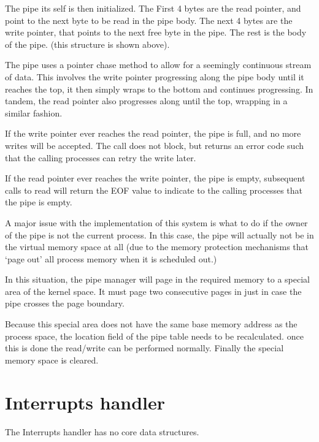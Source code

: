 \documentclass[a4paper]{report}
\begin{document}
The pipe its self is then initialized. The First 4 bytes are the read pointer, and point to the next byte to be read in the pipe body. The next 4 bytes are the write pointer, that points to the next free byte in the pipe. The rest is the body of the pipe. (this structure is shown above).

The pipe uses a pointer chase method to allow for a seemingly continuous stream of data. This involves the write pointer progressing along the pipe body until it reaches the top, it then simply wraps to the bottom and continues progressing. In tandem, the read pointer also progresses along until the top, wrapping in a similar fashion.

If the write pointer ever reaches the read pointer, the pipe is full, and no more writes will be accepted. The call does not block, but returns an error code such that the calling processes can retry the write later.

If the read pointer ever reaches the write pointer, the pipe is empty, subsequent calls to read will return the EOF value to indicate to the calling processes that the pipe is empty.

A major issue with the implementation of this system is what to do if the owner of the pipe is not the current process. In this case, the pipe will actually not be in the virtual memory space at all (due to the memory protection mechanisms that `page out' all process memory when it is scheduled out.)

In this situation, the pipe manager will page in the required memory to a special area of the kernel space. It must page two consecutive pages in just in case the pipe crosses the page boundary.

Because this special area does not have the same base memory address as the process space, the location field of the pipe table needs to be recalculated. once this is done the read/write can be performed normally. Finally the special memory space is cleared.










\clearpage

\section{Interrupts handler}

The Interrupts handler has no core data structures.
\end{document}
